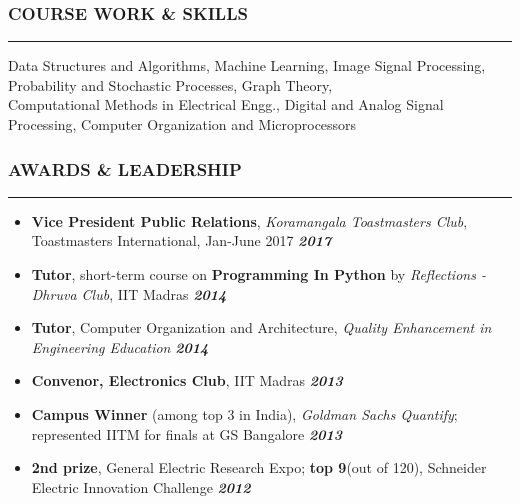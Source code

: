 \documentclass[10pt,a4paper,English]{article}
\newcommand\roottitle[1]{\vspace{-4mm}\subsubsection*{\uppercase{#1}}\vspace{-0.3em}\nopagebreak[4]\hrule\vspace{4mm}}
\newcommand\itemyear[1]{\hfill \textbf{\emph{\color{itemyear} #1}}}
\newcommand\itemenv{\setlength\itemsep{0.5pt} \addtolength{\itemindent}{-5mm}\vspace{-1.5mm}}
\begin{document}
\roottitle{Course Work \& Skills}
\vspace{-2mm}
\noindent Data Structures and Algorithms, Machine Learning, Image Signal Processing, Probability and Stochastic Processes, Graph Theory, \\ 
Computational Methods in Electrical Engg., Digital and Analog Signal Processing, Computer Organization and Microprocessors
\vspace{2mm}

\roottitle{Awards \& Leadership}
\begin{itemize} \itemenv
    \item \textbf{Vice President Public Relations}, \textit{Koramangala Toastmasters Club}, Toastmasters International, Jan-June 2017 \itemyear{2017}
    \item \textbf{Tutor}, short-term course on \textbf{Programming In Python} by \emph{Reflections - Dhruva Club}, IIT Madras \itemyear{2014}
    \item \textbf{Tutor}, Computer Organization and Architecture, \emph{Quality Enhancement in Engineering Education} \itemyear{2014}
    \item \textbf{Convenor, Electronics Club}, IIT Madras \itemyear{2013}
    \item \textbf{Campus Winner} (among top {3} in India), \textit{Goldman Sachs Quantify}; represented IITM for finals at GS Bangalore \itemyear{2013}
    \item \textbf{2nd prize}, General Electric Research Expo; \textbf{top 9}(out of 120), Schneider Electric Innovation Challenge \itemyear{2012}
\end{itemize}
\end{document}
